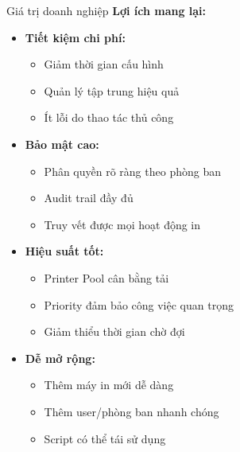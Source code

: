 \documentclass{beamer}
\begin{document}
    \begin{frame}{Giá trị doanh nghiệp}
        \textbf{Lợi ích mang lại:}
        \begin{itemize}
            \item \textbf{Tiết kiệm chi phí:}
                \begin{itemize}
                    \item Giảm thời gian cấu hình
                    \item Quản lý tập trung hiệu quả
                    \item Ít lỗi do thao tác thủ công
                \end{itemize}
            \item \textbf{Bảo mật cao:}
                \begin{itemize}
                    \item Phân quyền rõ ràng theo phòng ban
                    \item Audit trail đầy đủ
                    \item Truy vết được mọi hoạt động in
                \end{itemize}
            \item \textbf{Hiệu suất tốt:}
                \begin{itemize}
                    \item Printer Pool cân bằng tải
                    \item Priority đảm bảo công việc quan trọng
                    \item Giảm thiểu thời gian chờ đợi
                \end{itemize}
            \item \textbf{Dễ mở rộng:}
                \begin{itemize}
                    \item Thêm máy in mới dễ dàng
                    \item Thêm user/phòng ban nhanh chóng
                    \item Script có thể tái sử dụng
                \end{itemize}
        \end{itemize}
    \end{frame}
\end{document}

